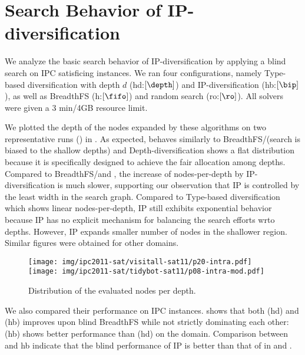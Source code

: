 \section{Search Behavior of IP-diversification}

We analyze the basic search behavior of IP-diversification by applying a blind search on IPC satisficing instances.
We ran four configurations, namely Type-based diversification with depth $d$ (hd:$[\depth]$) and IP-diversification (hb:$[\bip]$), as well as BreadthFS (h:$[\fifo]$) and random search (ro:$[\ro]$).
All solvers were given a 3 min/4GB resource limit.

We plotted the depth of the nodes expanded by these algorithms on two representative runs () in .
As expected, \ro behaves similarly to BreadthFS/\fifo (search is biased to the shallow depths) and
Depth-diversification shows a flat distribution because it is specifically designed to achieve the fair allocation among depths.
Compared to BreadthFS/\fifo and \ro, the increase of nodes-per-depth by IP-diversification is much slower, supporting our observation that IP is controlled by the least width in the search graph.
Compared to Type-based diversification which shows linear nodes-per-depth, IP still exhibits exponential behavior because IP has no explicit mechanism for balancing  the search  efforts wrto depths. However, IP expands smaller number of nodes in the shallower region.
Similar figures were obtained for other domains.

\begin{figure}[htbp]
 \centering
 \texttt{[image: img/ipc2011-sat/visitall-sat11/p20-intra.pdf]}
 \texttt{[image: img/ipc2011-sat/tidybot-sat11/p08-intra-mod.pdf]}
 \caption{Distribution of the evaluated nodes per depth.}
 \label{fig:distribution}
\end{figure}

We also compared their performance on IPC instances.
 shows that both (hd) and (hb) improves upon blind BreadthFS while 
not strictly dominating each other: (hb) shows better performance than
(hd) on the  domain.
Comparison between \ro and hb indicate that the blind performance of IP is better than that of \ro in  and .


